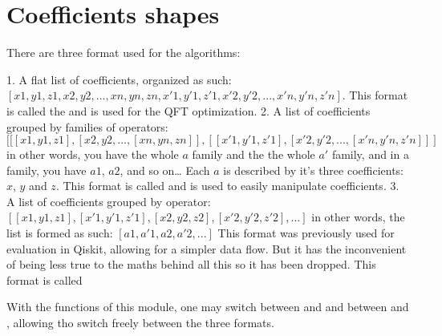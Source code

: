 \documentclass[letterpaper,10pt,english]{sphinxmanual}
\begin{document}
\chapter{Coefficients shapes}
\label{\detokenize{coefficients_shapes:module-mermin_on_qiskit.coefficients_shapes}}\label{\detokenize{coefficients_shapes:coefficients-shapes}}\label{\detokenize{coefficients_shapes::doc}}
There are three format used for the algorithms:

1. A flat list of coefficients, organized as such: 
\([x1,y1,z1, x2,y2, ..., xn,yn,zn, x'1,y'1,z'1, x'2,y'2, ..., x'n,y'n,z'n]\).
This format is called the  and is used for the QFT 
optimization.
2. A list of coefficients grouped by families of operators:
\([[[x1,y1,z1], [x2,y2, ..., [xn,yn,zn]], [[x'1,y'1,z'1], [x'2,y'2, ..., [x'n,y'n,z'n]]]\)
in other words, you have the whole \(a\) family and the the whole \(a'\) family,
and in a family, you have \(a1\), \(a2\), and so on… Each \(a\) is described by
it’s three coefficients: \(x\), \(y\) and \(z\).
This format is called  and is used to easily manipulate
coefficients.
3. A list of coefficients grouped by operator:
\([[x1,y1,z1], [x'1,y'1,z'1], [x2,y2,z2], [x'2,y'2,z'2], ...]\)
in other words, the list is formed as such: \([a1, a'1, a2, a'2, ...]\)
This format was previously used for evaluation in Qiskit, allowing for a
simpler data flow. But it has the inconvenient of being less true to the 
maths behind all this so it has been dropped. 
This format is called 

With the functions of this module, one may switch between  and  and 
between  and , allowing tho switch freely between the three formats.
\end{document}
